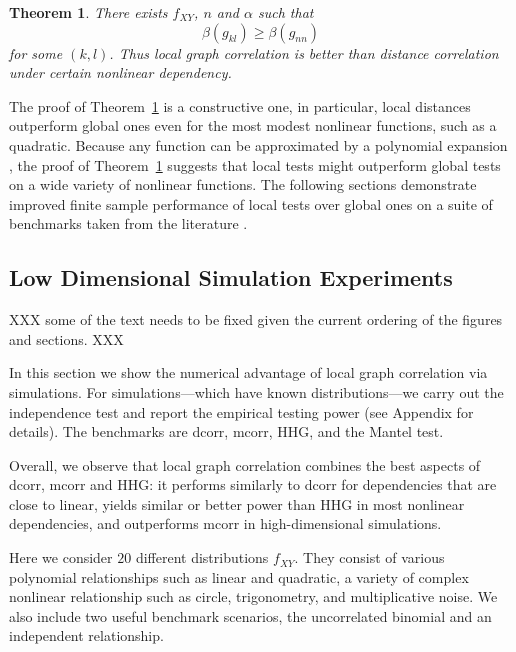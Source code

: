 \documentclass[11pt]{article}
\newtheorem{thm}{Theorem}
\begin{document}
\begin{thm}
\label{thm3}
There exists $f_{XY}$, $n$ and $\alpha$ such that 
\begin{equation}
\label{equ2}
\beta(g_{kl}) \geq \beta(g_{nn})
\end{equation}
for some $(k,l)$.
Thus local graph correlation is better than distance correlation under certain nonlinear dependency.
\end{thm}
The proof of Theorem~\ref{thm3} is a constructive one, in particular, local distances outperform global ones even for the most modest nonlinear functions, such as a quadratic.  Because any function can be approximated by a polynomial expansion \cite{XXX}, the proof of Theorem~\ref{thm3} suggests that local tests might outperform global tests on a wide variety of nonlinear functions.  The following sections demonstrate improved finite sample performance of local tests over global ones on a suite of benchmarks taken from the literature \cite{SzekelyRizzoBakirov2007, SimonTibshirani2012, GorfineHellerHeller2012, HellerGorfine2013}.




\subsection{Low Dimensional Simulation Experiments}
\label{numer1}

XXX some of the text needs to be fixed given the current ordering of the figures and sections. XXX

In this section we show the numerical advantage of local graph correlation via simulations. For simulations---which have known distributions---we carry out the independence test and report the empirical testing power (see Appendix for details). The benchmarks are dcorr, mcorr, HHG, and the Mantel test. 

Overall, we observe that local graph correlation combines the best aspects of dcorr, mcorr and HHG: it performs similarly to dcorr for dependencies that are close to linear, yields similar or better power than HHG in most nonlinear dependencies, and outperforms mcorr in high-dimensional simulations. 

Here we consider $20$ different distributions $f_{XY}$. They consist of various polynomial relationships such as linear and quadratic, a variety of complex nonlinear relationship such as circle, trigonometry, and multiplicative noise. We also include two useful benchmark scenarios, the uncorrelated binomial and an independent relationship. 
\end{document}
